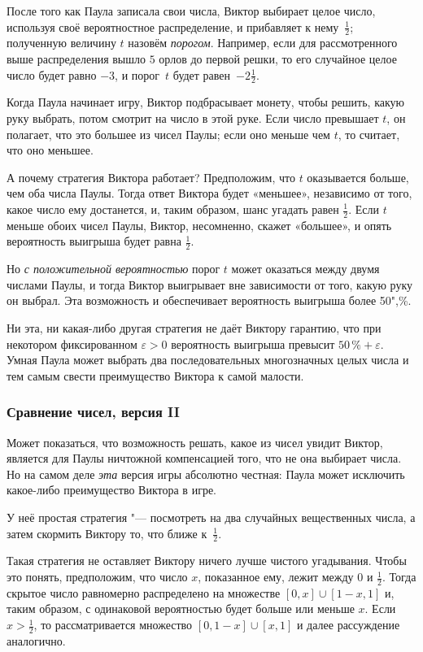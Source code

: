 \documentclass[twoside]{book}
\begin{document}
После того как Паула записала свои числа, Виктор выбирает целое число, используя своё вероятностное распределение, и прибавляет к нему~$\tfrac12$;
полученную величину $t$ назовём \emph{порогом}.
Например, если для рассмотренного выше распределения вышло $5$ орлов до первой решки, то его случайное целое число будет равно $-3$, и порог~$t$ будет равен~$-2 \tfrac12$.


Когда Паула начинает игру, Виктор подбрасывает монету, чтобы решить, какую руку выбрать, потом смотрит на число в этой руке.
Если число превышает $t$, он полагает, что это большее из чисел Паулы; если оно меньше чем $t$, то считает, что оно меньшее.

А почему стратегия Виктора работает? 
Предположим, что $t$ оказывается больше, чем оба числа Паулы.
Тогда ответ Виктора будет «меньшее», независимо от того, какое число ему достанется, и, таким образом, шанс угадать равен $\tfrac12$.
Если $t$ меньше обоих чисел Паулы, Виктор, несомненно, скажет «большее», и опять вероятность выигрыша будет равна $\tfrac12$.

Но \emph{с положительной вероятностью} порог $t$ может оказаться между двумя числами Паулы, и тогда Виктор выигрывает вне зависимости от того, какую руку он выбрал.
Эта возможность и обеспечивает вероятность выигрыша более 50",\%.\heart

Ни эта, ни какая-либо другая стратегия не даёт Виктору гарантию, что при некотором фиксированном $\varepsilon>0$ вероятность выигрыша превысит $50\,\%+\varepsilon$.
Умная Паула может выбрать два последовательных многозначных целых числа и тем самым свести преимущество Виктора к самой малости.

\subsubsection*{Сравнение чисел, версия II}%

Может показаться, что возможность решать, какое из чисел увидит Виктор, является для Паулы ничтожной компенсацией того, что не она выбирает числа.
Но на самом деле \emph{эта} версия игры абсолютно честная:
Паула может исключить какое-либо преимущество Виктора в игре.

У неё простая стратегия "--- посмотреть на два случайных вещественных числа, а затем скормить Виктору то, что ближе к~$\tfrac12$.

Такая стратегия не оставляет Виктору ничего лучше чистого угадывания.
Чтобы это понять, предположим, что число $x$, показанное ему, лежит между $0$ и $\tfrac12$.
Тогда скрытое число равномерно распределено на множестве $[0,x]\cup [1-x, 1]$ и, таким образом, с одинаковой вероятностью будет больше или меньше $x$.
Если $x>\tfrac12$, то рассматривается множество $[0, 1-x]\cup [x, 1]$ и далее рассуждение аналогично.
\end{document}
